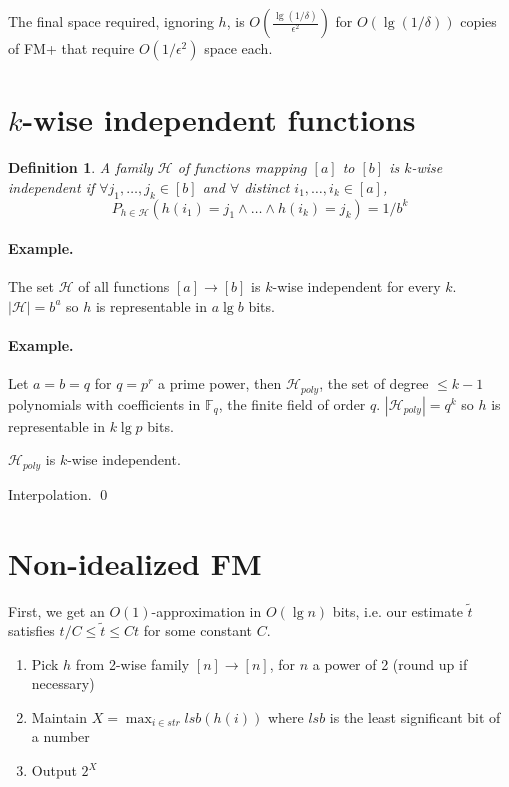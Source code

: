 \documentclass[11pt]{article}
\newtheorem{definition}[theorem]{Definition}
\begin{document}
The final space required, ignoring $h$, is $O(\frac{\lg(1/\delta)}{\epsilon^2})$ for $O(\lg (1/\delta))$ copies of FM+ that require $O(1/\epsilon^2)$ space each.

\section{$k$-wise independent functions}

\begin{definition} A family $\mathcal{H}$ of functions mapping $[a]$ to $[b]$ is $k$-wise independent if $\forall j_1, \ldots, j_k \in [b]$ and $\forall$ distinct $i_1, \ldots, i_k \in [a]$,
$$P_{h \in \mathcal{H}}(h(i_1) = j_1 \wedge \ldots \wedge h(i_k) = j_k) = 1/b^k$$ \end{definition}

\paragraph{Example.} The set $\mathcal{H}$ of all functions $[a] \to [b]$ is $k$-wise independent for every $k$. $|\mathcal{H}| = b^a$ so $h$ is representable in $a \lg b$ bits.

\paragraph{Example.} Let $a = b = q$ for $q = p^r$ a prime power, then $\mathcal{H}_{poly}$, the set of degree $\leq k-1$ polynomials with coefficients in $\mathbb F_q$, the finite field of order $q$. $|\mathcal{H}_{poly}| = q^k$ so $h$ is representable in $k \lg p$ bits.

\claim $\mathcal{H}_{poly}$ is $k$-wise independent.

\proof Interpolation. \qed

\section{Non-idealized FM}

First, we get an $O(1)$-approximation in $O(\lg n)$ bits, i.e. our estimate $\widetilde{t}$ satisfies $t/C \leq \widetilde{t} \leq Ct$ for some constant $C$.

\begin{enumerate}
\item Pick $h$ from 2-wise family $[n] \to [n]$, for $n$ a power of 2 (round up if necessary)
\item Maintain $X = \max_{i \in str} lsb(h(i))$ where $lsb$ is the least significant bit of a number
\item Output $2^X$
\end{enumerate}
\end{document}
